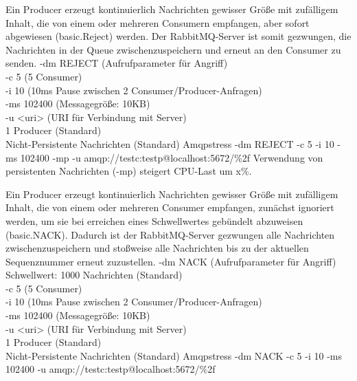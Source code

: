 \documentclass[	a4paper,
			11pt,
			titlepage,
			oneside,
			fleqn,
			listof=totoc,
			parskip,
			chapterprefix=false,
			numbers=noenddot]{scrartcl}
\begin{document}
\clearpage	
		{Ein Producer erzeugt kontinuierlich Nachrichten gewisser Größe mit zufälligem Inhalt, die von einem oder mehreren Consumern empfangen, aber sofort abgewiesen (basic.Reject) werden.%
		 Der RabbitMQ-Server ist somit gezwungen, die Nachrichten in der Queue zwischenzuspeichern und erneut an den Consumer zu senden.}%
		{%
		 -dm REJECT (Aufrufparameter für Angriff) \\
		 -c 5 (5 Consumer) \\
		 -i 10 (10ms Pause zwischen 2 Consumer/Producer-Anfragen) \\
		 -ms 102400 (Messagegröße: 10KB) \\
		 -u <uri> (URI für Verbindung mit Server) \\
		 1 Producer (Standard) \\
		 Nicht-Persistente Nachrichten (Standard)
		}%
		{Amqpstress -dm REJECT -c 5 -i 10 -ms 102400 -mp -u amqp://testc:testp@localhost:5672/\%2f}%
		{}%
		{Verwendung von persistenten Nachrichten (-mp) steigert CPU-Last um x\%.}
	
\clearpage	
		{Ein Producer erzeugt kontinuierlich Nachrichten gewisser Größe mit zufälligem Inhalt, die von einem oder mehreren Consumer empfangen, zunächst ignoriert werden, um sie bei erreichen eines Schwellwertes gebündelt abzuweisen (basic.NACK). Dadurch ist der RabbitMQ-Server gezwungen alle Nachrichten zwischenzuspeichern und stoßweise alle Nachrichten bis zu der aktuellen Sequenznummer erneut zuzustellen.}%
		{%
		 -dm NACK (Aufrufparameter für Angriff) \\
		 Schwellwert: 1000 Nachrichten (Standard) \\
		 -c 5 (5 Consumer) \\
		 -i 10 (10ms Pause zwischen 2 Consumer/Producer-Anfragen) \\
		 -ms 102400 (Messagegröße: 10KB) \\
		 -u <uri> (URI für Verbindung mit Server) \\
		 1 Producer (Standard) \\
		 Nicht-Persistente Nachrichten (Standard)
		}%
		{Amqpstress -dm NACK -c 5 -i 10 -ms 102400 -u amqp://testc:testp@localhost:5672/\%2f}%
		{}
		
\end{document}
